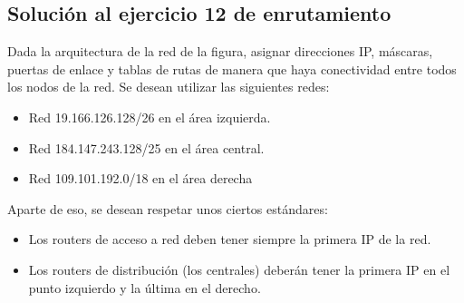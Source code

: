 \documentclass[letterpaper,10pt,spanish]{sphinxmanual}
\begin{document}
\subsection{Solución al ejercicio 12 de enrutamiento}
\label{\detokenize{t2_integracion_elementos/ejercicios_subredes_ipv4/ejercicios_dos_router:solucion-al-ejercicio-12-de-enrutamiento}}
\sphinxAtStartPar
Dada la arquitectura de la red de la figura, asignar direcciones IP, máscaras, puertas de enlace y tablas de rutas de manera que haya conectividad entre todos
los nodos de la red. Se desean utilizar las siguientes redes:
\begin{itemize}
\item {} 
\sphinxAtStartPar
Red 19.166.126.128/26 en el área izquierda.

\item {} 
\sphinxAtStartPar
Red 184.147.243.128/25 en el área central.

\item {} 
\sphinxAtStartPar
Red 109.101.192.0/18 en el área derecha

\end{itemize}

\begin{figure}[htbp]
\centering

\noindent{}
\end{figure}

\sphinxAtStartPar
Aparte de eso, se desean respetar unos ciertos estándares:
\begin{itemize}
\item {} 
\sphinxAtStartPar
Los routers de acceso a red deben tener siempre la primera IP de la red.

\item {} 
\sphinxAtStartPar
Los routers de distribución (los centrales) deberán tener la primera IP en el punto izquierdo y la última en el derecho.

\end{itemize}
\end{document}
